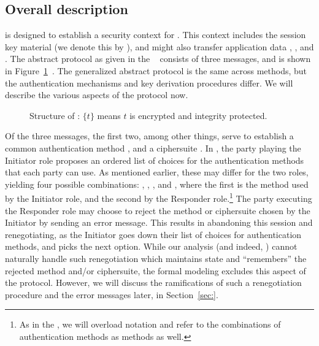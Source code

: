 \subsection{Overall description}
\label{sec:description}
\mEdhoc{} is designed to establish a security context for \mOscore{}.
%
This context includes the session key material (we denote this by \mSessKey{}), and might also transfer application data \mADone{}, \mADtwo{}, and \mADthree{}.
%
The abstract protocol as given in the \mSpec{}~\cite{} consists of three messages, and is shown in Figure~\ref{fig:edhocFramework}~\cite{Norr21}.
%
The generalized abstract protocol is the same across methods, but the authentication mechanisms and key derivation procedures differ. 
%
We will describe the various aspects of the protocol now.

\begin{figure}[ht]
\centering
{}
    \caption{Structure of \mEdhoc{}: $\{t\}$ means $t$ is encrypted and integrity
protected.~\cite{Norr21}}
\label{fig:edhocFramework}
\end{figure}

Of the three messages, the first two, among other things, serve to establish a common authentication method \mMethod{}, and a ciphersuite \mSuites{}.
%
In \mMethod{}, the party playing the Initiator role proposes an ordered list of choices for the authentication methods that each party can use. 
%
As mentioned earlier, these may differ for the two roles, yielding four possible combinations: \mSigSig{}, \mSigStat{}, \mStatSig{}, and \mStatStat{}, where the first is the method used by the Initiator role, and the second by the Responder role.\footnote{As in the \mSpec{}, we will overload notation and refer to the combinations of authentication methods as methods as well.}
%
The party executing the Responder role may choose to reject the method or ciphersuite chosen by the Initiator by sending an error message.
%
This results in abandoning this session and renegotiating, as the Initiator goes down their list of choices for authentication methods, and picks the next option.
%
While our analysis (and indeed, \mTamarin{}) cannot naturally handle such renegotiation which maintains state and ``remembers'' the rejected method and/or ciphersuite, the formal modeling excludes this aspect of the protocol. 
%
However, we will discuss the ramifications of such a renegotiation procedure and the error messages later, in Section~\ref{sec:}.
%

